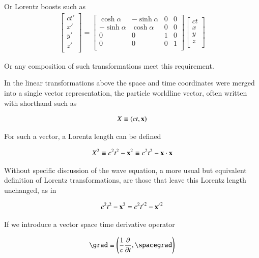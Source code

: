 Or Lorentz boosts such as
\begin{align}
\begin{bmatrix}
ct' \\
x' \\
y' \\
z' \\
\end{bmatrix}
=
\begin{bmatrix}
\cosh\alpha & -\sinh\alpha & 0 & 0 \\
-\sinh\alpha & \cosh\alpha & 0 & 0 \\
0 & 0 & 1 & 0 \\
0 & 0 & 0 & 1 \\
\end{bmatrix}
\begin{bmatrix}
ct \\
x \\
y \\
z \\
\end{bmatrix}
\end{align}

Or any composition of such transformations meet this requirement.

In the linear transformations above the space and time coordinates were merged into a single vector representation,
the particle worldline vector, often written with shorthand such as

\begin{align}
X \equiv (ct, \mathbf{x})
\end{align}

For such a vector, a Lorentz length can be defined

\begin{align}
X^2 \equiv c^2 t^2 - \mathbf{x}^2 \equiv c^2 t^2 - \mathbf{x} \cdot \mathbf{x}
\end{align}

Without specific discussion of the wave equation, 
a more usual but equivalent definition of Lorentz transformations, are those that leave this
Lorentz length unchanged, as in

\begin{align}
c^2 t^2 - \mathbf{x}^2 = c^2 {t'}^2 - {\mathbf{x}'}^2 
\end{align}

If we introduce a vector space time derivative operator

\begin{align}
\grad \equiv \left(\inv{c}\frac{\partial}{\partial t}, \spacegrad \right)
\end{align}

